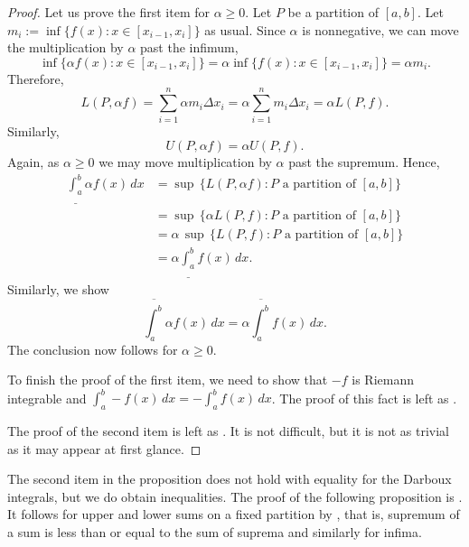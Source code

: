 \begin{proof}
\pagebreak[2]
Let us prove the first item for $\alpha \geq 0$. 
Let $P$ be a partition of $[a,b]$.
Let $m_i := \inf \bigl\{ f(x) : x \in [x_{i-1},x_i] \bigr\}$ as usual.
Since $\alpha$ is nonnegative, we can move the multiplication by $\alpha$
past the infimum,
\begin{equation*}
\inf \bigl\{ \alpha f(x) : x \in [x_{i-1},x_i] \bigr\}
=
\alpha \inf \bigl\{ f(x) : x \in [x_{i-1},x_i] \bigr\} = \alpha m_i .
\end{equation*}
Therefore,
\begin{equation*}
L(P,\alpha f) =
\sum_{i=1}^n \alpha m_i \Delta x_i = \alpha \sum_{i=1}^n m_i \Delta x_i = \alpha
L(P,f).
\end{equation*}
Similarly,
\begin{equation*}
U(P,\alpha f) = \alpha U(P,f) .
\end{equation*}
Again, as $\alpha \geq 0$ we
may move multiplication by $\alpha$ past the supremum.  Hence,
\begin{equation*}
\begin{split}
\underline{\int_a^b} \alpha f(x)\,dx & =
\sup \, \bigl\{ L(P,\alpha f) : P \text{ a partition of } [a,b] \bigr\}
\\
& =
\sup \, \bigl\{ \alpha L(P,f) : P \text{ a partition of } [a,b] \bigr\}
\\
& =
\alpha \,
\sup \, \bigl\{ L(P,f) : P \text{ a partition of } [a,b] \bigr\}
\\
& =
\alpha
\underline{\int_a^b} f(x)\,dx .
\end{split}
\end{equation*}
Similarly, we show 
\begin{equation*}
\overline{\int_a^b} \alpha f(x)\,dx
=
\alpha
\overline{\int_a^b} f(x)\,dx .
\end{equation*}
The conclusion now follows for $\alpha \geq 0$.

To finish the proof of the first item, we need to show 
that $-f$ is Riemann integrable and
$\int_a^b - f(x)\,dx =
-
\int_a^b f(x)\,dx$.  The proof of this fact is left as
.

The proof of the second item is left as
.
It is not difficult, but it is not as
trivial as it may appear at first glance.
\end{proof}

The second item in the proposition does not hold with
equality for the Darboux integrals, but we do obtain inequalities.
The proof of the following proposition is .
It follows for upper and lower sums on a fixed partition by ,
that is, supremum of a sum is less than or equal to the sum of
suprema and similarly for infima.


